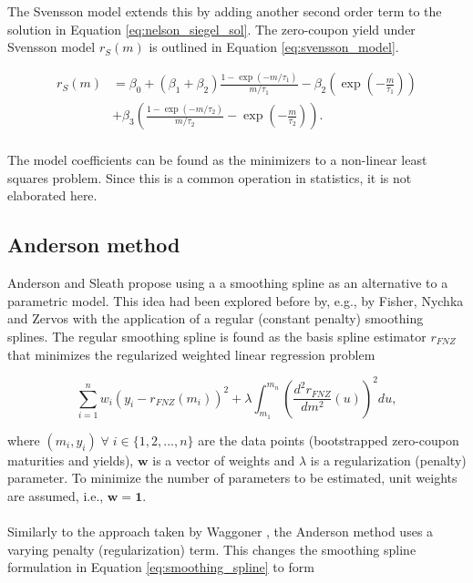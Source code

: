 \documentclass[a4paper]{artikel3}
\numberwithin{equation}{section}
\numberwithin{theorem}{section}
\numberwithin{proposition}{section}
\numberwithin{lemma}{section}
\begin{document}
The Svensson model extends this by adding another second order term to the solution in Equation \eqref{eq:nelson_siegel_sol}. The zero-coupon yield under Svensson model $r_{S}(m)$ is outlined in Equation \eqref{eq:svensson_model}.

\begin{equation}
    \label{eq:svensson_model}
    \begin{aligned}
        r_{S}(m) &= \beta_0 + (\beta_1 + \beta_2) \frac{1 - \exp \left( -m / \tau_1 \right)}{m / \tau_1} - \beta_2 \left( \exp \left( -\frac{m}{\tau_1} \right) \right) \\
             &+ \beta_3 \left( \frac{1 - \exp \left( -m / \tau_2 \right)}{m / \tau_2} - \exp \left( -\frac{m}{\tau_2} \right) \right) . \\
    \end{aligned}
\end{equation}

The model coefficients can be found as the minimizers to a non-linear least squares problem. Since this is a common operation in statistics, it is not elaborated here. 


\clearpage


\subsection{Anderson method}
\label{sec:anderson}


Anderson and Sleath \cite{anderson_sleath_1999} propose using a a smoothing spline as an alternative to a parametric model. This idea had been explored before by, e.g., by Fisher, Nychka and Zervos \cite{fisher_nychka_zervos_1995} with the application of a regular (constant penalty) smoothing splines. The regular smoothing spline is found as the basis spline estimator $r_{FNZ}$ that minimizes the regularized weighted linear regression problem

\begin{equation}
    \label{eq:smoothing_spline}
    \sum_{i=1}^n w_i (y_i - r_{FNZ}(m_i))^2 + \lambda \int_{m_1}^{m_n} \left( \frac{d^2 r_{FNZ}}{d m^2}(u) \right)^2 du ,
\end{equation}

where $(m_i, y_i) \; \forall \; i \in \{1, 2,...,n\}$ are the data points (bootstrapped zero-coupon maturities and yields), $\mathbf{w}$ is a vector of weights and $\lambda$ is a regularization (penalty) parameter. To minimize the number of parameters to be estimated, unit weights are assumed, i.e., $\mathbf{w} = \mathbf{1}$. \\
\\
Similarly to the approach taken by Waggoner \cite{waggoner_1997}, the Anderson method uses a varying penalty (regularization) term. This changes the smoothing spline formulation in Equation \eqref{eq:smoothing_spline} to form 
\end{document}
